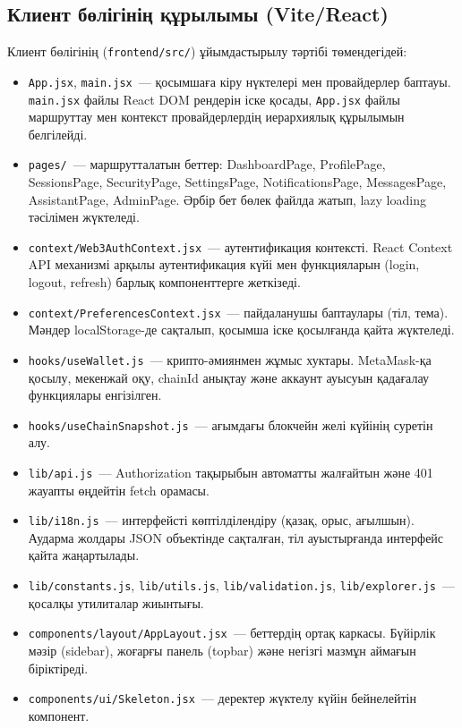 \documentclass[14pt,a4paper]{extarticle}
\begin{document}
\subsection{Клиент бөлігінің құрылымы (Vite/React)}

Клиент бөлігінің (\texttt{frontend/src/}) ұйымдастырылу тәртібі төмендегідей:
\begin{itemize}[nosep]
\item \texttt{App.jsx}, \texttt{main.jsx}~--- қосымшаға кіру нүктелері мен провайдерлер баптауы. \texttt{main.jsx} файлы React DOM рендерін іске қосады, \texttt{App.jsx} файлы маршруттау мен контекст провайдерлердің иерархиялық құрылымын белгілейді.
\item \texttt{pages/}~--- маршрутталатын беттер: DashboardPage, ProfilePage, SessionsPage, SecurityPage, SettingsPage, NotificationsPage, MessagesPage, AssistantPage, AdminPage. Әрбір бет бөлек файлда жатып, lazy loading тәсілімен жүктеледі.
\item \texttt{context/Web3AuthContext.jsx}~--- аутентификация контексті. React Context API механизмі арқылы аутентификация күйі мен функцияларын (login, logout, refresh) барлық компоненттерге жеткізеді.
\item \texttt{context/PreferencesContext.jsx}~--- пайдаланушы баптаулары (тіл, тема). Мәндер localStorage-де сақталып, қосымша іске қосылғанда қайта жүктеледі.
\item \texttt{hooks/useWallet.js}~--- крипто-әмиянмен жұмыс хуктары. MetaMask-қа қосылу, мекенжай оқу, chainId анықтау және аккаунт ауысуын қадағалау функциялары енгізілген.
\item \texttt{hooks/useChainSnapshot.js}~--- ағымдағы блокчейн желі күйінің суретін алу.
\item \texttt{lib/api.js}~--- Authorization тақырыбын автоматты жалғайтын және 401 жауапты өңдейтін fetch орамасы.
\item \texttt{lib/i18n.js}~--- интерфейсті көптілділендіру (қазақ, орыс, ағылшын). Аударма жолдары JSON объектінде сақталған, тіл ауыстырғанда интерфейс қайта жаңартылады.
\item \texttt{lib/constants.js}, \texttt{lib/utils.js}, \texttt{lib/validation.js}, \texttt{lib/explorer.js}~--- қосалқы утилиталар жиынтығы.
\item \texttt{components/layout/AppLayout.jsx}~--- беттердің ортақ каркасы. Бүйірлік мәзір (sidebar), жоғарғы панель (topbar) және негізгі мазмұн аймағын біріктіреді.
\item \texttt{components/ui/Skeleton.jsx}~--- деректер жүктелу күйін бейнелейтін компонент.
\end{itemize}
\end{document}

